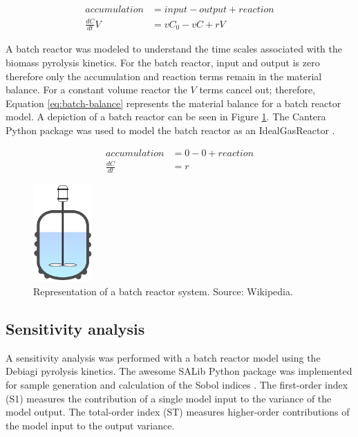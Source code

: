 \begin{equation}
    \label{eq:typical-balance}
    \begin{aligned}
        accumulation &= input - output + reaction \\
        \frac{dC}{dt} V &= v C_0 - v C + r V
    \end{aligned}
\end{equation}

A batch reactor was modeled to understand the time scales associated with the biomass pyrolysis kinetics. For the batch reactor, input and output is zero therefore only the accumulation and reaction terms remain in the material balance. For a constant volume reactor the $V$ terms cancel out; therefore, Equation \ref{eq:batch-balance} represents the material balance for a batch reactor model. A depiction of a batch reactor can be seen in Figure \ref{fig:batch-reactor}. The Cantera Python package was used to model the batch reactor as an IdealGasReactor \cite{Cantera-2018}.

\begin{equation}
    \label{eq:batch-balance}
    \begin{aligned}
        accumulation &= 0 - 0 + reaction \\
        \frac{dC}{dt} &= r
    \end{aligned}
\end{equation}

\begin{figure}[H]
    \centering
    \includegraphics[width=0.2\textwidth]{figures/batch-reactor.png}
    \caption{Representation of a batch reactor system. Source: Wikipedia.}
    \label{fig:batch-reactor}
\end{figure}

\subsection{Sensitivity analysis}

A sensitivity analysis was performed with a batch reactor model using the Debiagi pyrolysis kinetics. The awesome SALib Python package was implemented for sample generation and calculation of the Sobol indices \cite{Herman-2017}. The first-order index (S1) measures the contribution of a single model input to the variance of the model output. The total-order index (ST) measures higher-order contributions of the model input to the output variance.


